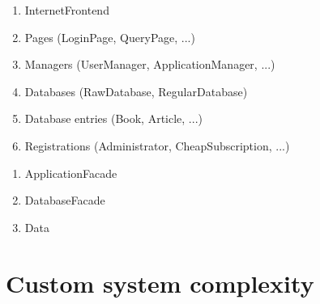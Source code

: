 \begin{enumerate}
    \item InternetFrontend
    \item Pages (LoginPage, QueryPage, ...)
    \item Managers (UserManager, ApplicationManager, ...)
    \item Databases (RawDatabase, RegularDatabase)
    \item Database entries (Book, Article, ...)
    \item Registrations (Administrator, CheapSubscription, ...)
\end{enumerate}

\begin{enumerate}
    \item ApplicationFacade
    \item DatabaseFacade
    \item Data
\end{enumerate}

\section{Custom system complexity}
